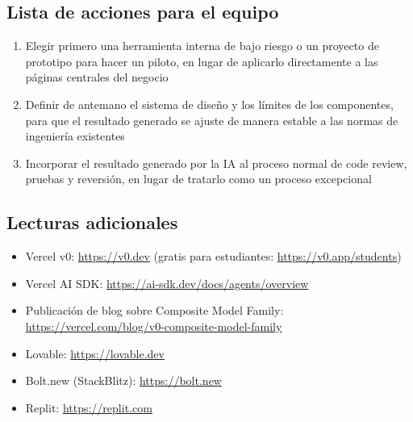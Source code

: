 \documentclass[a4paper]{article}
\begin{document}
\subsection{Lista de acciones para el equipo}

\begin{enumerate}
    \item Elegir primero una herramienta interna de bajo riesgo o un proyecto de prototipo para hacer un piloto, en lugar de aplicarlo directamente a las páginas centrales del negocio
    \item Definir de antemano el sistema de diseño y los límites de los componentes, para que el resultado generado se ajuste de manera estable a las normas de ingeniería existentes
    \item Incorporar el resultado generado por la IA al proceso normal de code review, pruebas y reversión, en lugar de tratarlo como un proceso excepcional
\end{enumerate}

\subsection{Lecturas adicionales}

\begin{itemize}
    \item Vercel v0: \url{https://v0.dev} (gratis para estudiantes: \url{https://v0.app/students})
    \item Vercel AI SDK: \url{https://ai-sdk.dev/docs/agents/overview}
    \item Publicación de blog sobre Composite Model Family: \url{https://vercel.com/blog/v0-composite-model-family}
    \item Lovable: \url{https://lovable.dev}
    \item Bolt.new (StackBlitz): \url{https://bolt.new}
    \item Replit: \url{https://replit.com}
\end{itemize}

\end{document}
